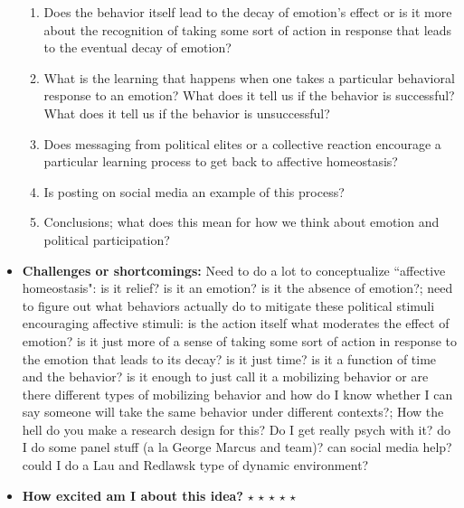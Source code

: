 \documentclass[12pt]{article}
\begin{document}
\begin{itemize}
\begin{enumerate}
            \item Does the behavior itself lead to the decay of emotion's effect or is it more about the recognition of taking some sort of action in response that leads to the eventual decay of emotion?
            \item What is the learning that happens when one takes a particular behavioral response to an emotion? What does it tell us if the behavior is successful? What does it tell us if the behavior is unsuccessful?
            \item Does messaging from political elites or a collective reaction encourage a particular learning process to get back to affective homeostasis?
            \item Is posting on social media an example of this process?
            \item Conclusions; what does this mean for how we think about emotion and political participation?
        \end{enumerate}
        \item \textbf{Challenges or shortcomings:} Need to do a lot to conceptualize ``affective homeostasis": is it relief? is it an emotion? is it the absence of emotion?; need to figure out what behaviors actually do to mitigate these political stimuli encouraging affective stimuli: is the action itself what moderates the effect of emotion? is it just more of a sense of taking some sort of action in response to the emotion that leads to its decay? is it just time? is it a function of time and the behavior? is it enough to just call it a mobilizing behavior or are there different types of mobilizing behavior and how do I know whether I can say someone will take the same behavior under different contexts?; How the hell do you make a research design for this? Do I get really psych with it? do I do some panel stuff (a la George Marcus and team)? can social media help? could I do a Lau and Redlawsk type of dynamic environment?
        \item \textbf{How excited am I about this idea?} $\star$ $\star$ $\star$ $\star$ $\star$
    \end{itemize}
\end{document}

